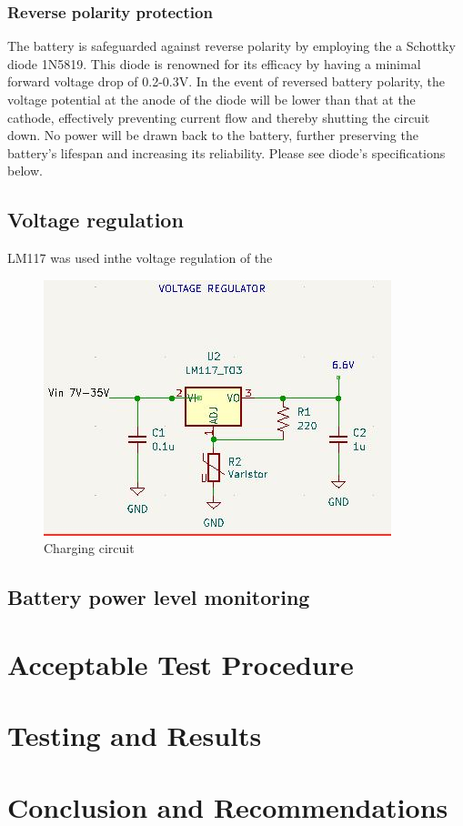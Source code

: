 \documentclass[class=report,11pt,crop=false]{standalone}
\begin{document}
	\subsubsection{Reverse polarity protection}
	\vspace{0.5cm}
	
	The battery is safeguarded against reverse polarity by employing the a Schottky diode 1N5819. This diode is renowned for its efficacy by having a minimal forward voltage drop of 0.2-0.3V. In the event of reversed battery polarity, the voltage potential at the anode of the diode will be lower than that at the cathode, effectively preventing current flow and thereby shutting the circuit down. No power will be drawn back to the battery, further preserving the battery's lifespan and increasing its reliability. Please see diode's specifications below.
	
	
	\subsection{Voltage regulation}
	LM117 was used inthe voltage regulation of the 
	
	
	\begin{figure}[h!]
		\centering
		\includegraphics[width=0.9\linewidth]{Figures/regulator.jpg}
		\caption{Charging circuit}
		\label{fig: P1}
	\end{figure}
	
	
	\subsection{Battery power level monitoring}
	
	\section{Acceptable Test Procedure}
	
	\section{Testing and Results}
	
	\section{Conclusion and Recommendations}
	
\end{document}
